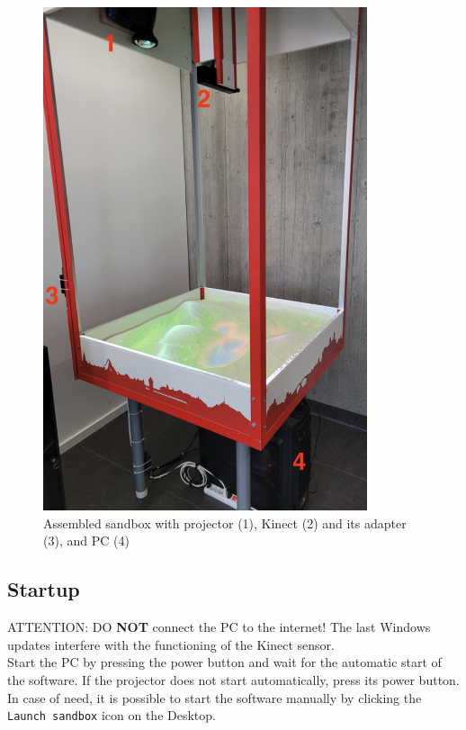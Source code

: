 \documentclass[12pt]{article}
\begin{document}
\begin{figure}[H]
	\centering
	\includegraphics[width=0.85\textwidth]{img/sandbox.jpg}
	\caption*{Assembled sandbox with projector (1), Kinect (2) and its adapter (3), and PC (4)}
\end{figure}


\subsection{Startup}

ATTENTION: DO \textbf{NOT} connect the PC to the internet! The last Windows updates interfere with the functioning of the Kinect sensor.\\

Start the PC by pressing the power button and wait for the automatic start of the software. If the projector does not start automatically, press its power button.
In case of need, it is possible to start the software manually by clicking the \texttt{Launch sandbox} icon on the Desktop.\\
\end{document}

